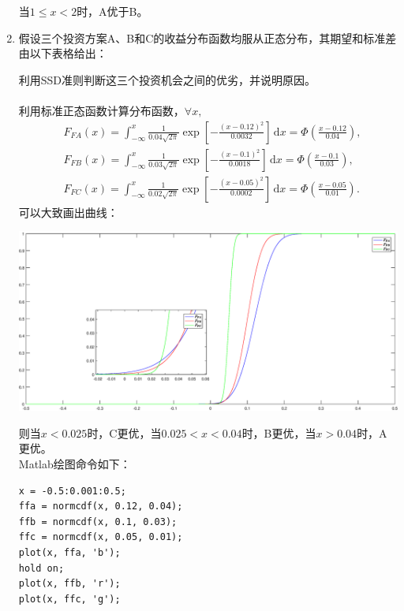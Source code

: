 \begin{enumerate}
    当$1 \leqslant x < 2$时，A优于B。
    \item 假设三个投资方案A、B和C的收益分布函数均服从正态分布，其期望和标准差由以下表格给出：
    \begin{center}
    \end{center}
    利用SSD准则判断这三个投资机会之间的优劣，并说明原因。\\
    \sol\\
    利用标准正态函数计算分布函数，$\forall x,$
    \[\begin{array}{ll}
        & \displaystyle F_{FA}(x) = \int_{-\infty}^x \frac{1}{0.04\sqrt{2\pi}}\exp\left[-\frac{(x-0.12)^2}{0.0032}\right] \, \mathrm{d}x = \Phi \left(\frac{x-0.12}{0.04}\right),\\
        & \displaystyle F_{FB}(x) = \int_{-\infty}^x \frac{1}{0.03\sqrt{2\pi}}\exp\left[-\frac{(x-0.1)^2}{0.0018}\right] \, \mathrm{d}x = \Phi \left(\frac{x-0.1}{0.03}\right),\\
        & \displaystyle F_{FC}(x) = \int_{-\infty}^x \frac{1}{0.02\sqrt{2\pi}}\exp\left[-\frac{(x-0.05)^2}{0.0002}\right] \, \mathrm{d}x = \Phi \left(\frac{x-0.05}{0.01}\right).
    \end{array}\]
    可以大致画出曲线：
    \begin{center}
        \includegraphics[scale=0.49]{1_5.eps}
    \end{center}
    则当$x < 0.025$时，C更优，当$0.025 < x < 0.04$时，B更优，当$x > 0.04$时，A更优。\\
    Matlab绘图命令如下：
\begin{lstlisting}
x = -0.5:0.001:0.5;
ffa = normcdf(x, 0.12, 0.04);
ffb = normcdf(x, 0.1, 0.03);
ffc = normcdf(x, 0.05, 0.01);
plot(x, ffa, 'b');
hold on;
plot(x, ffb, 'r');
plot(x, ffc, 'g');
\end{lstlisting}
\end{enumerate}
\clearpage